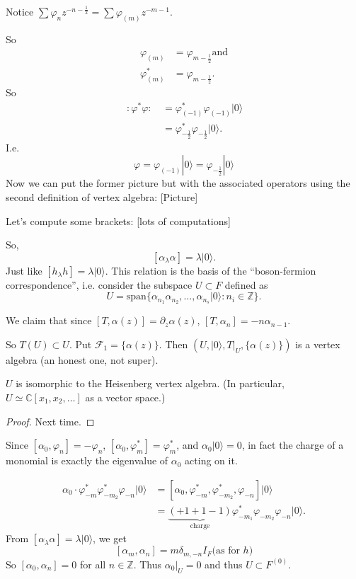 Notice $\sum \varphi_n z^{-n-\frac{1}{2}}=
\sum \varphi_{(m)}z^{-m-1}$.

So
$$
\begin{aligned}
\varphi_{(m)}&=\varphi_{m-\frac{1}{2}}\text{
and}\\
\varphi^*_{(m)}&=\varphi_{m-\frac{1}{2}}.
\end{aligned}
$$
So
$$
\begin{aligned}
\,:\!\varphi^*\varphi\!:\,&=\varphi_{(-1)}
^*\varphi_{(-1)}|0\rangle\\
&=\varphi_{-\frac{1}{2}}^*\varphi_{-\frac{1}
{2}}|0\rangle.
\end{aligned}
$$
I.e.
$$
\varphi=\varphi_{(-1)}|0\rangle=\varphi_{-
\frac{1}{2}}|0\rangle
$$
Now we can put the former picture but with
the
associated operators using the
second definition of vertex algebra:
[Picture]

Let's compute some brackets: [lots of
computations]

So,
$$
[\alpha_\lambda \alpha]=\lambda |0\rangle.
$$
Just like $[h_\lambda h]=\lambda |0\rangle$.
This relation is the basis of the
``boson-fermion correspondence'', i.e.
consider the subspace $U \subset F$ defined
as
 $$
U=\text{span}\{\alpha_{n_1}\alpha_{n_2},
\ldots,\alpha_{n_s}|0\rangle
:n_{i} \in \mathbb{Z}\}.
$$

We claim that since $[T,\alpha(z)]=\partial_z
\alpha(z)$,
$[T,\alpha_n]=-n\alpha_{n-1}$.

So $T(U) \subset U$. Put
$\mathcal{F}_1=\{\alpha(z)\}$.
Then $(U,|0\rangle,T|_{U},\{\alpha(z)\})$ is
a vertex algebra
(an honest one, not super).

\begin{proposition}
\label{proposition-isomorphic-to-Heisenberg}
$U$ is isomorphic to the Heisenberg
vertex algebra. (In particular,
$U \simeq \mathbb{C}[x_1,x_2,\ldots]$
as a vector space.)
\end{proposition}

\begin{proof}
Next time.
\end{proof}

Since $[\alpha_0,\varphi_n]=-\varphi_n$,
$[\alpha_0,\varphi_m^*]=\varphi_m^*$,
and $\alpha_0 |0\rangle=0$, in fact the
charge of a monomial is exactly the
eigenvalue of $\alpha_0$ acting on it.

$$
\begin{aligned}
\alpha_0\cdot\varphi^*_{-m}\varphi^*_{-m_2}
\varphi_{-n}|0\rangle
&=[\alpha_0,\varphi^*_{-m},\varphi^*_{-m_2},
\varphi_{-n}]|0\rangle\\
&=\underbrace{(+1+1-1)}_{\text{charge}}
\varphi_{-m_1}^*\varphi_{-m_2}\varphi_{-n}
|0\rangle.
\end{aligned}
$$
From $[\alpha_\lambda \alpha]=\lambda
|0\rangle$,
we get
$$
[\alpha_m,\alpha_n]=m\delta_{m,-n}I_F\text{
(as for $h$)}
$$
So $[\alpha_0,\alpha_n]=0$ for all $n \in
\mathbb{Z}$.
Thus  $\alpha_0 |_{ U}=0$ and thus $U \subset
F^{(0)}$.

